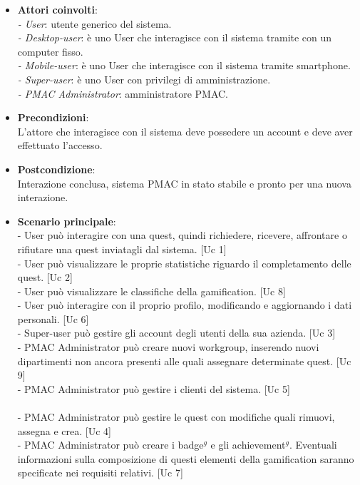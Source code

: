 \documentclass[10pt,a4paper]{article}
\begin{document}
\begin{itemize}
\item \textbf{Attori coinvolti}:\\
\emph{- User}: utente generico del sistema.\\
\emph{- Desktop-user}: è uno User che interagisce con il sistema tramite con un computer fisso.\\
\emph{- Mobile-user}: è uno User che interagisce con il sistema tramite smartphone.\\
\emph{- Super-user}: è uno User con privilegi di amministrazione.\\
\emph{- PMAC Administrator}: amministratore PMAC.

\item \textbf{Precondizioni}:\\
L'attore che interagisce con il sistema deve possedere un account e deve aver effettuato l'accesso.

\item \textbf{Postcondizione}:\\
Interazione conclusa, sistema PMAC in stato stabile e pronto per una nuova interazione.

\item \textbf{Scenario principale}:\\
- User può interagire con una quest, quindi richiedere, ricevere, affrontare o rifiutare una quest inviatagli dal sistema. [Uc 1]\\
- User può visualizzare le proprie statistiche riguardo il completamento delle quest. [Uc 2]\\
- User può visualizzare le classifiche della gamification. [Uc 8]\\
- User può interagire con il proprio profilo, modificando e aggiornando i dati personali. [Uc 6]\\
- Super-user può gestire gli account degli utenti della sua azienda. [Uc 3]\\
- PMAC Administrator può creare nuovi workgroup, inserendo nuovi dipartimenti non ancora presenti alle quali assegnare determinate quest. [Uc 9]\\
- PMAC Administrator può gestire i clienti del sistema. [Uc 5]\\\\
- PMAC Administrator può gestire le quest con modifiche quali rimuovi, assegna e crea. [Uc 4]\\
- PMAC Administrator può creare i badge$^g$ e gli achievement$^g$. Eventuali informazioni sulla composizione di questi elementi della gamification saranno specificate nei requisiti relativi. [Uc 7]
\end{itemize}
\end{document}
